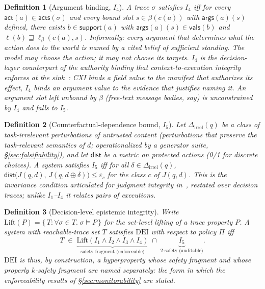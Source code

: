 \documentclass[conference,compsoc]{IEEEtran}
\newtheorem{definition}{Definition}
\theoremstyle{definition}
\theoremstyle{plain}
\newcommand{\Ione}{\ensuremath{I_1}}
\newcommand{\Itwo}{\ensuremath{I_2}}
\newcommand{\Ithree}{\ensuremath{I_3}}
\newcommand{\Ifour}{\ensuremath{I_4}}
\newcommand{\Ifive}{\ensuremath{I_5}}
\providecommand{\Lift}{\mathrm{Lift}}
\newcommand{\support}{\ensuremath{\mathsf{support}}}
\newcommand{\acts}{\ensuremath{\mathsf{acts}}}
\newcommand{\args}{\ensuremath{\mathsf{args}}}
\newcommand{\vals}{\ensuremath{\mathsf{vals}}}
\newcommand{\bindpol}{\ensuremath{\beta}}
\newcommand{\ev}[1]{\ensuremath{\mathsf{#1}}}
\newcommand{\Dirrel}{\ensuremath{\Delta_{\mathrm{irrel}}}}
\newcommand{\dist}{\ensuremath{\mathsf{dist}}}
\newcommand{\DEI}{\ensuremath{\mathrm{DEI}}}
\begin{document}
\begin{definition}[Argument binding, \Ifour]
\label{def:i4}
A trace $\sigma$ satisfies \Ifour{} iff for every
$\ev{act}(a) \in \acts(\sigma)$ and every bound slot
$s \in \bindpol(c(a))$ with $\args(a)(s)$ defined, there exists
$b \in \support(a)$ with $\args(a)(s) \in \vals(b)$ and
$\ell(b) \sqsupseteq \ell_{\bindpol}(c(a), s)$. Informally: every
argument that determines what the action does to the world is named by
a cited belief of sufficient standing. The model may choose the action;
it may not choose its targets. \Ifour{} is the decision-layer
counterpart of the authority binding that context-to-execution
integrity enforces at the sink~\cite{cxi}: CXI binds a field value to
the manifest that authorizes its effect, \Ifour{} binds an argument
value to the evidence that justifies naming it. An argument slot left
unbound by $\bindpol$ (free-text message bodies, say) is unconstrained
by \Ifour{} and falls to \Ifive.
\end{definition}

\begin{definition}[Counterfactual-dependence bound, \Ifive]
\label{def:i5}
Let $\Dirrel(q)$ be a class of task-irrelevant perturbations of
untrusted content (perturbations that preserve the task-relevant
semantics of $d$; operationalized by a generator suite,
\S\ref{sec:falsifiability}), and let $\dist$ be a metric on
protected actions (0/1 for discrete choices). A system satisfies
\Ifive{} iff for all $\delta \in \Dirrel(q)$,
$\dist\big(J(q, d),\, J(q, d \oplus \delta)\big) \leq \varepsilon_{c}$
for the class $c$ of $J(q,d)$. This is the invariance condition
articulated for judgment integrity in~\cite{qu}, restated over decision
traces; unlike \Ione--\Ifour{} it relates \emph{pairs} of executions.
\end{definition}

\begin{definition}[Decision-level epistemic integrity]
\label{def:dei}
Write $\Lift(P) = \{\,T : \forall \sigma \in T.\; \sigma \models P\,\}$
for the set-level lifting of a trace property $P$. A system with
reachable-trace set $T$ satisfies \DEI{} with respect to policy
$\Pi$ iff
\[
T \;\in\; \underbrace{\Lift(\Ione \wedge \Itwo \wedge \Ithree \wedge \Ifour)}_{\text{safety fragment (enforceable)}} \;\cap\; \underbrace{\Ifive}_{\text{2-safety (auditable)}} .
\]
\DEI{} is thus, by construction, a hyperproperty whose safety fragment
and whose properly $k$-safety fragment are named separately: the form in
which the enforceability results of \S\ref{sec:monitorability} are
stated.
\end{definition}
\end{document}
